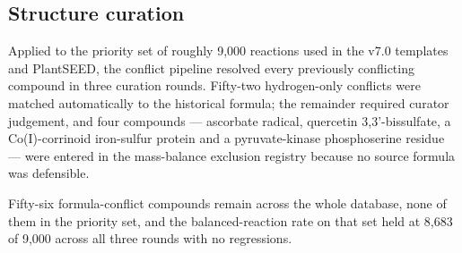 \subsection{Structure curation}\label{sec:results-structure}

Applied to the priority set of roughly 9,000 reactions used in the v7.0
templates and PlantSEED, the conflict pipeline resolved every previously
conflicting compound in three curation rounds. Fifty-two hydrogen-only
conflicts were matched automatically to the historical formula; the remainder
required curator judgement, and four compounds --- ascorbate radical,
quercetin 3,3'-bissulfate, a Co(I)-corrinoid iron-sulfur protein and a
pyruvate-kinase phosphoserine residue --- were entered in the mass-balance
exclusion registry because no source formula was defensible.

Fifty-six formula-conflict compounds remain across the whole database, none of
them in the priority set, and the balanced-reaction rate on that set held at
8,683 of 9,000 across all three rounds with no regressions.
